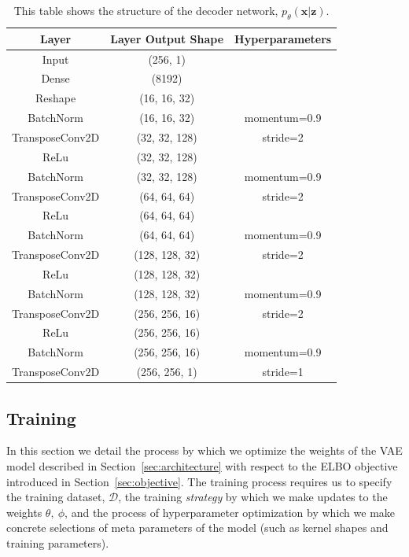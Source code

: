 \documentclass[fleqn,usenatbib]{mnras}
\begin{document}
\begin{table}
    \centering
    \begin{tabular}{c|c|c}
         \hline
        Layer & Layer Output Shape & Hyperparameters \\
        \hline
        \hline
        Input & (256, 1) & \\
        Dense & (8192) & \\
        Reshape & (16, 16, 32) & \\
        BatchNorm & (16, 16, 32) & momentum=0.9 \\
        TransposeConv2D & (32, 32, 128) & stride=2\\
        ReLu & (32, 32, 128) & \\
        BatchNorm & (32, 32, 128) & momentum=0.9 \\
        TransposeConv2D & (64, 64, 64) & stride=2\\
        ReLu & (64, 64, 64) & \\
        BatchNorm & (64, 64, 64) & momentum=0.9 \\
        TransposeConv2D & (128, 128, 32) & stride=2\\
        ReLu & (128, 128, 32) & \\
        BatchNorm & (128, 128, 32) & momentum=0.9 \\
        TransposeConv2D & (256, 256, 16) & stride=2\\
        ReLu & (256, 256, 16) & \\
        BatchNorm & (256, 256, 16) & momentum=0.9 \\
        TransposeConv2D & (256, 256, 1) & stride=1\\
        \hline
    \end{tabular}
    \caption{This table shows the structure of the decoder network, $p_\theta(\mathbf x | \mathbf{z})$.}
    \label{tab:decoder}
\end{table}

\subsection{Training}
\label{sec:training} 

In this section we detail the process by which we optimize the weights of the VAE model described in Section~\ref{sec:architecture} with respect to the ELBO objective introduced in Section~\ref{sec:objective}. 
The training process requires us to specify the training dataset, $\mathcal{D}$, the training \emph{strategy} by which we make updates to the weights $\theta,~\phi$, and the process of hyperparameter optimization by which we make concrete selections of meta parameters of the model (such as kernel shapes and training parameters).
\end{document}
